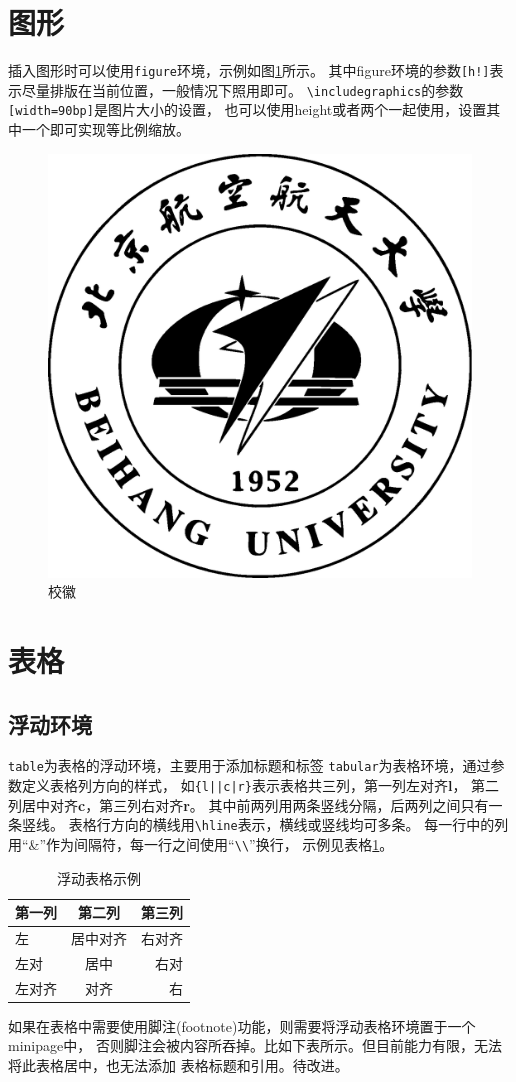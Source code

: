 \section{图形}
\label{sec-figure}
插入图形时可以使用\texttt{figure}环境，示例如图\ref{fig-sample}所示。
其中figure环境的参数\verb|[h!]|表示尽量排版在当前位置，一般情况下照用即可。
\verb|\includegraphics|的参数\verb|[width=90bp]|是图片大小的设置，
也可以使用height或者两个一起使用，设置其中一个即可实现等比例缩放。
\begin{figure}[h!]
    \centering
    \includegraphics[width=90bp]{figure/buaamark.eps}
    \caption{校徽}
    \label{fig-sample}
\end{figure}

\section{表格}
\label{sec-table}

\subsection{浮动环境}
\label{subsec-table-float}
\texttt{table}为表格的浮动环境，主要用于添加标题和标签
\texttt{tabular}为表格环境，通过参数定义表格列方向的样式，
如\verb+{l||c|r}+表示表格共三列，第一列左对齐{\bf l}，
第二列居中对齐{\bf c}，第三列右对齐{\bf r}。
其中前两列用两条竖线分隔，后两列之间只有一条竖线。
表格行方向的横线用\verb|\hline|表示，横线或竖线均可多条。
每一行中的列用“\&”作为间隔符，每一行之间使用“\verb|\\|”换行，
示例见表格\ref{tab-sample}。
\begin{table}
    \centering
    \caption{浮动表格示例}
    \label{tab-sample}
    \begin{tabular}{l||c|r}
        \hline
        第一列 & 第二列   & 第三列 \\ \hline \hline
        左     & 居中对齐 & 右对齐 \\ \hline
        左对   & 居中     & 右对   \\ \hline
        左对齐 & 对齐     & 右     \\ \hline
    \end{tabular}
\end{table}
如果在表格中需要使用脚注(footnote)功能，则需要将浮动表格环境置于一个minipage中，
否则脚注会被内容所吞掉。比如下表所示。但目前能力有限，无法将此表格居中，也无法添加
表格标题和引用。待改进。

